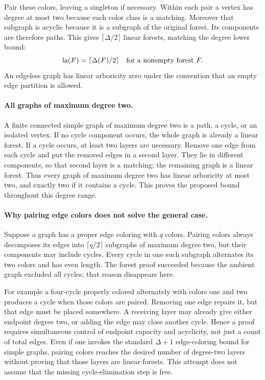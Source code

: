 \documentclass[11pt,a4paper]{article}
\begin{document}
Pair these colors, leaving a singleton if necessary. Within each
pair a vertex has degree at most two because each color class is a
matching. Moreover that subgraph is acyclic because it is a subgraph
of the original forest. Its components are therefore paths. This
gives $\lceil\Delta/2\rceil$ linear forests, matching the degree
lower bound:
\[
                 \operatorname{la}(F)=\lceil\Delta(F)/2\rceil
                 \quad\hbox{for a nonempty forest }F.
\]
An edgeless graph has linear arboricity zero under the convention
that an empty edge partition is allowed.

\paragraph{All graphs of maximum degree two.}
A finite connected simple graph of maximum degree two is a path, a
cycle, or an isolated vertex. If no cycle component occurs, the whole
graph is already a linear forest. If a cycle occurs, at least two
layers are necessary. Remove one edge from each cycle and put the
removed edges in a second layer. They lie in different components,
so that second layer is a matching; the remaining graph is a linear
forest. Thus every graph of maximum degree two has linear arboricity
at most two, and exactly two if it contains a cycle. This proves
the proposed bound throughout this degree range.

\paragraph{Why pairing edge colors does not solve the general case.}
Suppose a graph has a proper edge coloring with $q$ colors. Pairing
colors always decomposes its edges into $\lceil q/2\rceil$ subgraphs
of maximum degree two, but their components may include cycles. Every
cycle in one such subgraph alternates its two colors and has even
length. The forest proof succeeded because the ambient graph excluded
all cycles; that reason disappears here.

For example a four-cycle properly colored alternately with colors one
and two produces a cycle when those colors are paired. Removing one
edge repairs it, but that edge must be placed somewhere. A receiving
layer may already give either endpoint degree two, or adding the edge
may close another cycle. Hence a proof requires simultaneous control
of endpoint capacity and acyclicity, not just a count of total edges.
Even if one invokes the standard $\Delta+1$ edge-coloring bound for
simple graphs, pairing colors reaches the desired number of degree-two
layers without proving that those layers are linear forests. This
attempt does not assume that the missing cycle-elimination step is free.
\end{document}
